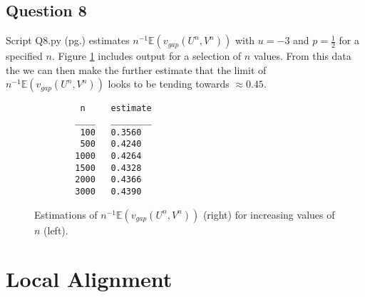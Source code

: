 \documentclass[a4paper]{article}
\begin{document}
\subsection*{Question 8}
Script Q8.py (pg.\pageref{PQ8}) estimates $n^{-1}\mathbb{E}(v_{gap}(U^n,V^n))$ with $u=-3$ and $p=\frac{1}{2}$ for a specified $n$. Figure \ref{fig:q8} includes output for a selection of $n$ values. From this data the we can then make the further estimate that the limit of $n^{-1}\mathbb{E}(v_{gap}(U^n,V^n))$ looks to be tending towards $\approx 0.45$.
\begin{figure}[H]
    \centering
    \begin{verbatim}
         n     estimate
        ____   ________
         100   0.3560
         500   0.4240
        1000   0.4264
        1500   0.4328
        2000   0.4366
        3000   0.4390
    \end{verbatim}
    \caption{Estimations of $n^{-1}\mathbb{E}(v_{gap}(U^n,V^n))$ (right) for increasing values of $n$ (left).}
    \label{fig:q8}
\end{figure}

\section*{Local Alignment}
\end{document}
